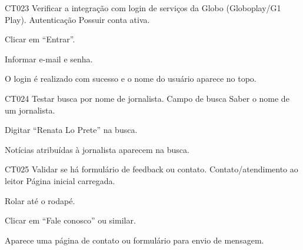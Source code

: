 \documentclass[12pt]{article}
\begin{document}
\casodeteste
{CT023}
{Verificar a integração com login de serviços da Globo (Globoplay/G1 Play).}
{Autenticação}
{Possuir conta ativa.}
{
\item Clicar em “Entrar”.
\item Informar e-mail e senha.
}
{O login é realizado com sucesso e o nome do usuário aparece no topo.}

\casodeteste
{CT024}
{Testar busca por nome de jornalista.}
{Campo de busca}
{Saber o nome de um jornalista.}
{
\item Digitar “Renata Lo Prete” na busca.
}
{Notícias atribuídas à jornalista aparecem na busca.}

\casodeteste
{CT025}
{Validar se há formulário de feedback ou contato.}
{Contato/atendimento ao leitor}
{Página inicial carregada.}
{
\item Rolar até o rodapé.
\item Clicar em “Fale conosco” ou similar.
}
{Aparece uma página de contato ou formulário para envio de mensagem.}

\end{document}

